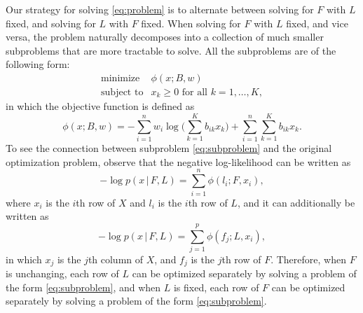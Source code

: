 \documentclass[final]{siamart171218}
\begin{document}
Our strategy for solving \eqref{eq:problem} is to alternate between
solving for $F$ with $L$ fixed, and solving for $L$ with $F$
fixed. When solving for $F$ with $L$ fixed, and vice versa, the
problem naturally decomposes into a collection of much smaller
subproblems that are more tractable to solve. All the subproblems are
of the following form:
\begin{equation}
\begin{array}{ll}
\mbox{minimize} & \phi(x; B, w) \\
\mbox{subject to} & \mbox{$x_k \geq 0$ for all $k = 1, \ldots, K$},
\end{array}
\label{eq:subproblem}
\end{equation}
in which the objective function is defined as
\begin{equation}
\phi(x; B, w) =
    - \sum_{i=1}^n w_i \log\big({\textstyle \sum_{k=1}^K b_{ik} x_k}\big)
    + \sum_{i=1}^n \sum_{k=1}^K b_{ik} x_k.
\label{eq:subproblem-objective}
\end{equation}
To see the connection between subproblem \eqref{eq:subproblem} and the
original optimization problem, observe that the negative
log-likelihood can be written as
\begin{equation}
-\log p(x \,|\, F, L) = \sum_{i=1}^n \phi(l_i; F, x_i),
\end{equation}
where $x_i$ is the $i$th row of $X$ and $l_i$ is the $i$th row of $L$,
and it can additionally be written as
\begin{equation}
-\log p(x \,|\, F, L) = \sum_{j=1}^p \phi(f_j; L, x_i),
\end{equation}
in which $x_j$ is the $j$th column of $X$, and $f_j$ is the $j$th row
of $F$. Therefore, when $F$ is unchanging, each row of $L$ can be
optimized separately by solving a problem of the form
\eqref{eq:subproblem}, and when $L$ is fixed, each row of $F$ can be
optimized separately by solving a problem of the form
\eqref{eq:subproblem}.



\end{document}
